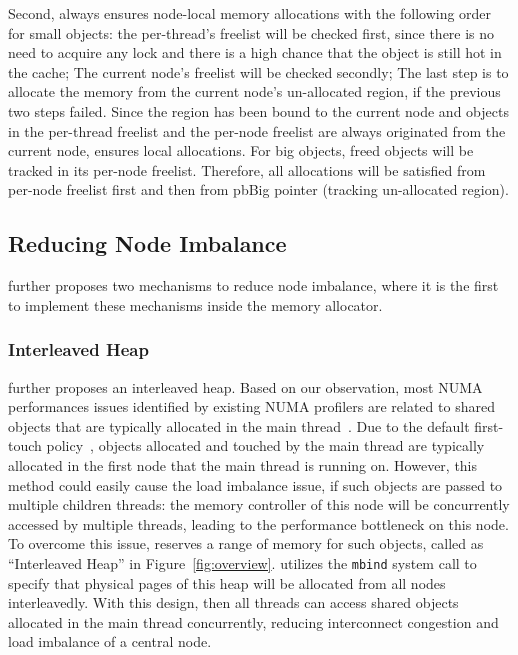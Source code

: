 Second, \NM{} always ensures node-local memory allocations with the following order for small objects: the per-thread's freelist will be checked first, since there is no need to acquire any lock and there is a high chance that the object is still hot in the cache; The current node's freelist will be checked secondly; The last step is to allocate the memory from the current node's un-allocated region, if the previous two steps failed. Since the region has been bound to the current node and objects in the per-thread freelist and the per-node freelist are always originated from the current node, \NM{} ensures local allocations. For big objects, freed objects will be tracked in its per-node freelist. Therefore, all allocations will be satisfied from per-node freelist first and then from pbBig pointer (tracking un-allocated region). 

\subsection{Reducing Node Imbalance}
\label{sec:balance}

\NM{} further proposes two mechanisms to reduce node imbalance, where it is the first to implement these mechanisms inside the memory allocator. 
\subsubsection{Interleaved Heap} 
\NA{} further proposes an interleaved heap. Based on our observation, most NUMA performances issues identified by existing NUMA profilers are related to shared objects that are typically allocated in the main thread~\cite{XULIU, MemProf}. Due to the default first-touch policy~\cite{lameter2013numa, diener2015locality}, objects allocated and touched by the main thread are typically allocated in the first node that the main thread is running on. However, this method could easily cause the load imbalance issue, if such objects are passed to multiple children threads: the memory controller of this node will be concurrently accessed by multiple threads, leading to the performance bottleneck on this node. To overcome this issue, \NA{} reserves a range of memory for such objects, called as ``Interleaved Heap'' in Figure~\ref{fig:overview}. \NA{} utilizes the \texttt{mbind} system call to specify that physical pages of this heap will be allocated from all nodes interleavedly. With this design, then all threads can access shared objects allocated in the main thread concurrently, reducing interconnect congestion and load imbalance of a central node. 

